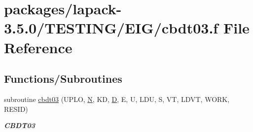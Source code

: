 \hypertarget{cbdt03_8f}{}\section{packages/lapack-\/3.5.0/\+T\+E\+S\+T\+I\+N\+G/\+E\+I\+G/cbdt03.f File Reference}
\label{cbdt03_8f}
\subsection*{Functions/\+Subroutines}
\begin{DoxyCompactItemize}
\item 
subroutine \hyperlink{group__complex__eig_gab4e31f7060577f077726594263453bef}{cbdt03} (U\+P\+L\+O, \hyperlink{polmisc_8c_a0240ac851181b84ac374872dc5434ee4}{N}, K\+D, \hyperlink{odrpack_8h_a7dae6ea403d00f3687f24a874e67d139}{D}, E, U, L\+D\+U, S, V\+T, L\+D\+V\+T, W\+O\+R\+K, R\+E\+S\+I\+D)
\begin{DoxyCompactList}\small\item\em {\bfseries C\+B\+D\+T03} \end{DoxyCompactList}\end{DoxyCompactItemize}
